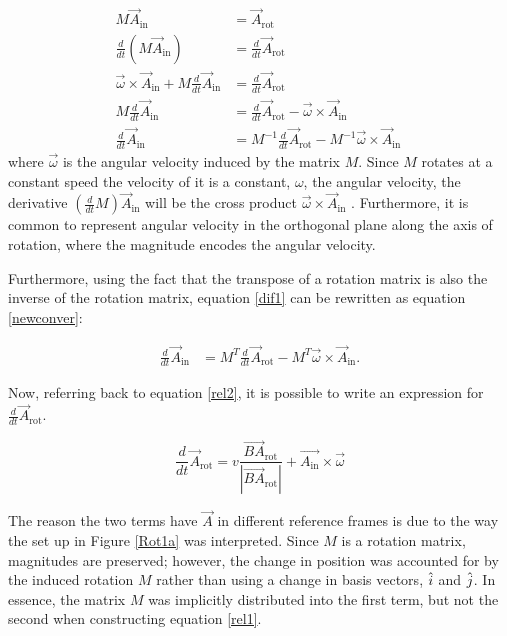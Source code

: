 \documentclass[pstricks, border=12pt]{article}
\begin{document}
\begin{equation}
    \begin{split}
        M\Vec{A}_{\text{in}} &= \Vec{A}_{\text{rot}}\\
        \frac{d}{dt}\left(M\Vec{A}_{\text{in}}\right) &= \frac{d}{dt}\Vec{A}_{\text{rot}}\\
         \vec\omega\times\Vec{A}_{\text{in}} + M\frac{d}{dt}\Vec{A}_{\text{in}} &=\frac{d}{dt}\Vec{A}_{\text{rot}}\\
        M\frac{d}{dt}\Vec{A}_{\text{in}} &= \frac{d}{dt}\Vec{A}_{\text{rot}} -\vec\omega\times\Vec{A}_{\text{in}}\\
        \frac{d}{dt}\Vec{A}_{\text{in}}&= M^{-1}\frac{d}{dt}\Vec{A}_{\text{rot}} - M^{-1} \vec\omega\times\Vec{A}_{\text{in}}
    \end{split}\
    \label{dif1}
\end{equation}
where $\vec\omega$ is the angular velocity induced by the matrix $M$. Since $M$ rotates at a constant speed the velocity of it is a constant, $\omega$, the angular velocity, the derivative $\left(\frac{d}{dt}M\right)\vec A_{\text{in}}$ will be the cross product $\vec\omega\times\vec A_{\text{in}}$ \cite{kundu_tritton}. Furthermore, it is common to represent angular velocity in the orthogonal plane along the axis of rotation, where the magnitude encodes the angular velocity.

Furthermore, using the fact that the transpose of a rotation matrix is also the inverse of the rotation matrix, equation \eqref{dif1} can be rewritten as equation \eqref{newconver}:

\begin{equation}
    \begin{split}
        \frac{d}{dt}\Vec{A}_{\text{in}}&= M^{T}\frac{d}{dt}\Vec{A}_{\text{rot}} - M^{T}\vec\omega\times\Vec{A}_{\text{in}}.
    \end{split}
    \label{newconver}
\end{equation}

Now, referring back to equation \eqref{rel2}, it is possible to write an expression for $\frac{d}{dt}\Vec{A}_{\text{rot}}$.

\begin{equation}
    \frac{d}{dt}\Vec{A}_{\text{rot}} = v\frac{\Vec{BA}_{\text{rot}}}{\left|\Vec{BA}_{\text{rot}}\right|} + \Vec{A_{\text{in}}}\times\vec\omega
    \label{newRot}
\end{equation}

The reason the two terms have $\Vec{A}$ in different reference frames is due to the way the set up in Figure \ref{Rot1a} was interpreted. Since $M$ is a rotation matrix, magnitudes are preserved; however, the change in position was accounted for by the induced rotation $M$ rather than using a change in basis vectors, $\Hat{i}$ and $\Hat{j}$. In essence, the matrix $M$ was implicitly distributed into the first term, but not the second when constructing equation \ref{rel1}.
\end{document}
